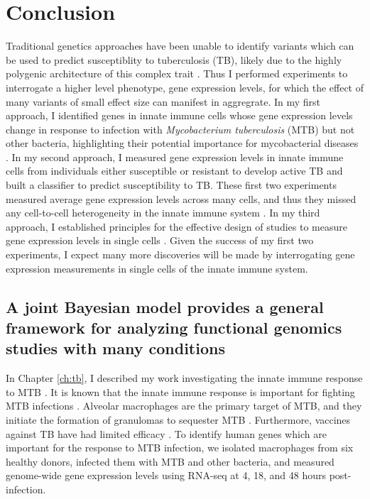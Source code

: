 \chapter{Conclusion}\label{conclusion}

Traditional genetics approaches have been unable to identify variants
which can be used to predict susceptiblity to tuberculosis (TB),
likely due to the highly polygenic architecture of this complex trait
\citep{Thye2010, Mahasirimongkol2012, Thye2012, Png2012, Chimusa2014, Curtis2015, Sobota2016}.
Thus I performed experiments to interrogate a higher level phenotype,
gene expression levels, for which the effect of many variants of small
effect size can manifest in aggregrate. In my first approach, I
identified genes in innate immune cells whose gene expression levels
change in response to infection with \emph{Mycobacterium tuberculosis}
(MTB) but not other bacteria, highlighting their potential importance
for mycobacterial diseases \citep{Blischak2015}. In my second approach, I measured gene
expression levels in innate immune cells from individuals either
susceptible or resistant to develop active TB and built a
classifier to predict susceptibility to TB. These first two
experiments measured average gene expression levels across many
cells, and thus they missed any cell-to-cell heterogeneity in the innate
immune system \citep{Satija2014, Proserpio2016}. In my third approach, I established principles for the
effective design of studies to measure gene expression levels in
single cells \citep{Tung2016}. Given the success of my first two experiments, I expect
many more discoveries will be made by interrogating gene expression
measurements in single cells of the innate immune system.

\section{A joint Bayesian model provides a general framework for analyzing functional genomics studies with many conditions}

In Chapter \ref{ch:tb}, I described my work investigating the innate immune
response to MTB \citep{Blischak2015}. It is
known that the innate immune response is important for fighting MTB
infections \citep{Khan2016}. Alveolar macrophages are the primary target of MTB, and they
initiate the formation of granulomas to sequester MTB \citep{Sia2015}. Furthermore, vaccines
against TB have had limited efficacy \citep{Wang2013}. To identify human genes which are
important for the response to MTB infection, we isolated macrophages from six
healthy donors, infected them with MTB and other bacteria, and measured
genome-wide gene expression levels using RNA-seq at 4, 18, and 48 hours
post-infection.

